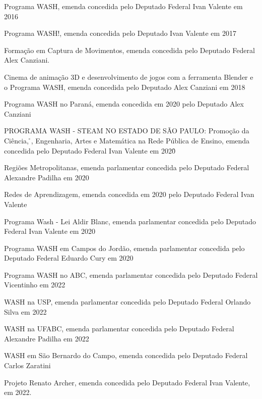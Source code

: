\documentclass[
12pt,		%
openright,	%
twoside,  %
a4paper,			%
chapter=TITLE,		%
english,			%
french,				%
spanish,			%
brazil				%
]{USPSC-classe/USPSC}
\begin{document}
\begin{alineas}
\item \textquotedbl Programa WASH, emenda concedida pelo Deputado Federal Ivan Valente em 2016
\item \textquotedbl Programa WASH!\textquotedbl , emenda concedida pelo Deputado Ivan Valente em 2017
\item \textquotedbl Forma\c{c}\~ao em Captura de Movimentos\textquotedbl , emenda concedida pelo Deputado Federal Alex Canziani.
\item \textquotedbl Cinema de anima\c{c}\~ao 3D e desenvolvimento de jogos com a ferramenta Blender e o Programa WASH\textquotedbl , emenda concedida pelo Deputado Alex Canziani em 2018
\item \textquotedbl Programa WASH no Paran\'a\textquotedbl , emenda concedida em 2020 pelo Deputado Alex Canziani
\item \textquotedbl PROGRAMA WASH - STEAM NO ESTADO DE S\~AO PAULO: Promo\c{c}\~ao da Ci\^encia, \r\nTecnologia, Engenharia, Artes  e Matem\'atica na Rede P\'ublica de Ensino\textquotedbl , emenda concedida pelo Deputado Federal Ivan Valente em 2020\r\n
\item \textquotedbl Regi\~oes Metropolitanas\textquotedbl , emenda parlamentar concedida pelo Deputado Federal Alexandre Padilha em 2020
\item \textquotedbl Redes de Aprendizagem\textquotedbl , emenda concedida em 2020 pelo Deputado Federal Ivan Valente
\item \textquotedbl Programa Wash - Lei Aldir Blanc\textquotedbl , emenda parlamentar concedida pelo Deputado Federal  Ivan Valente em 2020
\item \textquotedbl Programa WASH em Campos do Jord\~ao\textquotedbl , emenda parlamentar concedida pelo Deputado Federal Eduardo Cury em 2020
\item \textquotedbl Programa WASH no ABC\textquotedbl , emenda parlamentar concedida pelo Deputado Federal Vicentinho em 2022
\item \textquotedbl WASH na USP\textquotedbl , emenda parlamentar concedida pelo Deputado Federal Orlando Silva em 2022
\item \textquotedbl WASH na UFABC\textquotedbl , emenda parlamentar concedida pelo Deputado Federal Alexandre Padilha em 2022
\item \textquotedbl WASH em S\~ao Bernardo do Campo\textquotedbl , emenda concedida pelo Deputado Federal Carlos Zaratini
\item \textquotedbl Projeto Renato Archer\textquotedbl , emenda concedida pelo Deputado Federal Ivan Valente, em 2022.
\end{alineas}
\end{document}
